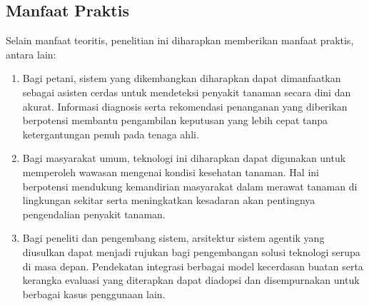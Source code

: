 \subsection{Manfaat Praktis}
Selain manfaat teoritis, penelitian ini diharapkan memberikan manfaat praktis, antara lain:
\begin{enumerate}[nosep]
    \item Bagi petani, sistem yang dikembangkan diharapkan dapat dimanfaatkan sebagai asisten cerdas untuk mendeteksi penyakit tanaman secara dini dan akurat. Informasi diagnosis serta rekomendasi penanganan yang diberikan berpotensi membantu pengambilan keputusan yang lebih cepat tanpa ketergantungan penuh pada tenaga ahli.
    \item Bagi masyarakat umum, teknologi ini diharapkan dapat digunakan untuk memperoleh wawasan mengenai kondisi kesehatan tanaman. Hal ini berpotensi mendukung kemandirian masyarakat dalam merawat tanaman di lingkungan sekitar serta meningkatkan kesadaran akan pentingnya pengendalian penyakit tanaman.
    \item Bagi peneliti dan pengembang sistem, arsitektur sistem agentik yang diusulkan dapat menjadi rujukan bagi pengembangan solusi teknologi serupa di masa depan. Pendekatan integrasi berbagai model kecerdasan buatan serta kerangka evaluasi yang diterapkan dapat diadopsi dan disempurnakan untuk berbagai kasus penggunaan lain.
\end{enumerate}



